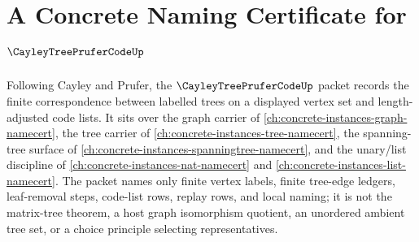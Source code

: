 \chapter{A Concrete Naming Certificate for $\CayleyTreePruferCodeUp$}
\label{ch:concrete-instances-cayley-tree-prufer-code-namecert}

Following Cayley and Prufer, the $\CayleyTreePruferCodeUp$ packet records the finite correspondence between labelled trees on a displayed vertex set and length-adjusted code lists. It sits over the graph carrier of \autoref{ch:concrete-instances-graph-namecert}, the tree carrier of \autoref{ch:concrete-instances-tree-namecert}, the spanning-tree surface of \autoref{ch:concrete-instances-spanningtree-namecert}, and the unary/list discipline of \autoref{ch:concrete-instances-nat-namecert} and \autoref{ch:concrete-instances-list-namecert}. The packet names only finite vertex labels, finite tree-edge ledgers, leaf-removal steps, code-list rows, replay rows, and local naming; it is not the matrix-tree theorem, a host graph isomorphism quotient, an unordered ambient tree set, or a choice principle selecting representatives.

